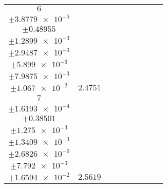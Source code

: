 \documentclass[8pt]{article}
\begin{document}
\begin{longtable}[l]{c c c c c c c c c}
$\num{6}$ & \begin{tabular}[c]{@{}c@{}}$\num{2.9591e-2}$ \\ $\pm\num{3.8779e-5}$\end{tabular} & \begin{tabular}[c]{@{}c@{}}$\num{0.5027}$ \\ $\pm\num{0.48955}$\end{tabular} & \begin{tabular}[c]{@{}c@{}}$\num{7.0656}$ \\ $\pm\num{1.2899e-3}$\end{tabular} & \begin{tabular}[c]{@{}c@{}}$\num{1.1867e+3}$ \\ $\pm\num{2.9487e-3}$\end{tabular} & \begin{tabular}[c]{@{}c@{}}$\num{2.3741}$ \\ $\pm\num{5.899e-6}$\end{tabular} & \begin{tabular}[c]{@{}c@{}}$\num{1.144}$ \\ $\pm\num{7.9875e-3}$\end{tabular} & \begin{tabular}[c]{@{}c@{}}$\num{4.0937}$ \\ $\pm\num{1.067e-2}$\end{tabular} & $\num{2.4751}$\\
$\num{7}$ & \begin{tabular}[c]{@{}c@{}}$\num{2.9999e-2}$ \\ $\pm\num{1.6193e-4}$\end{tabular} & \begin{tabular}[c]{@{}c@{}}$\num{0.42142}$ \\ $\pm\num{0.38501}$\end{tabular} & \begin{tabular}[c]{@{}c@{}}$\num{7.284}$ \\ $\pm\num{1.275e-3}$\end{tabular} & \begin{tabular}[c]{@{}c@{}}$\num{1.187e+3}$ \\ $\pm\num{1.3409e-3}$\end{tabular} & \begin{tabular}[c]{@{}c@{}}$\num{2.3746}$ \\ $\pm\num{2.6826e-6}$\end{tabular} & \begin{tabular}[c]{@{}c@{}}$\num{1.1573}$ \\ $\pm\num{7.792e-3}$\end{tabular} & \begin{tabular}[c]{@{}c@{}}$\num{4.0328}$ \\ $\pm\num{1.6594e-2}$\end{tabular} & $\num{2.5619}$\\

\end{longtable}
\end{document}
